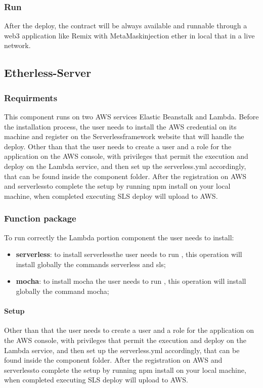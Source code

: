 \subsubsection{Run}
After the deploy, the contract will be always available and runnable through a web3 application like Remix with MetaMask\glo injection ether in local that in a live network.
\subsection{Etherless-Server}
\subsubsection{Requirments}
This component runs on two AWS services Elastic Beanstalk and Lambda.
Before the installation process, the user needs to install the AWS credential on its
machine and register on the Serverless\glo framework website that will handle the deploy.
Other than that the user needs to create a user and a role for the application on the AWS console,
with privileges that permit the execution and deploy on the Lambda service, and then set up the serverless.yml accordingly,
that can be found inside the component folder.
After the registration on AWS and serverless\glo to complete the setup by running npm install on your local machine, when completed executing SLS deploy will upload to AWS.
\subsubsection{Function package}
To run correctly the Lambda portion component the user needs to install:
\begin{itemize}
    \item \textbf{serverless}: to install serverless\glo the user needs to run , this operation will install globally the commands serverless and sls;
    \item \textbf{mocha}: to install mocha the user needs to run , this operation will install globally the command mocha;
\end{itemize}
\paragraph{Setup}
Other than that the user needs to create a user and a role for the application on the AWS console,
with privileges that permit the execution and deploy on the Lambda service, and then set up the serverless.yml accordingly,
that can be found inside the component folder.
After the registration on AWS and serverless\glo to complete the setup by running npm install on your local machine, when completed executing SLS deploy will upload to AWS.
